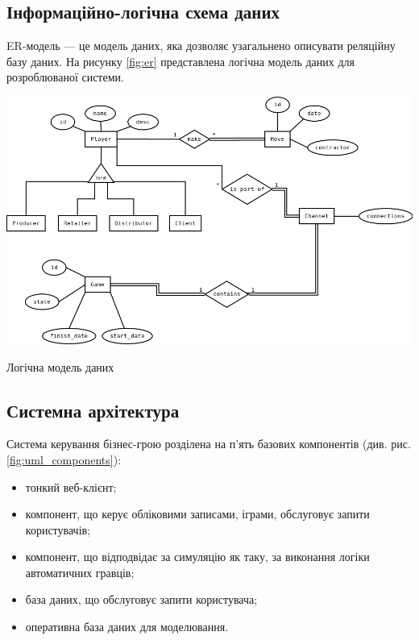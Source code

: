 \subsection{Інформаційно-логічна схема даних}
ER-модель --- це модель даних, яка дозволяє узагальнено описувати реляційну базу даних. На рисунку \ref{fig:er} представлена логічна модель даних для розроблюваної системи.

\begin{stdfigure}
    \includegraphics[width=7in]{images/er.png}
    \caption{Логічна модель даних}
    \label{fig:er}
\end{stdfigure}   

\subsection{Системна архітектура}
Система керування бізнес-грою розділена на п’ять базових компонентів (див. рис. \ref{fig:uml_components}): 
\begin{itemize}
\item тонкий веб-клієнт;
\item компонент, що керує обліковими записами, іграми, обслуговує запити користувачів;
\item компонент, що відподвідає за симуляцію як таку, за виконання логіки автоматичних гравців;
\item база даних, що обслуговує запити користувача;
\item оперативна база даних для моделювання.
\end{itemize}

